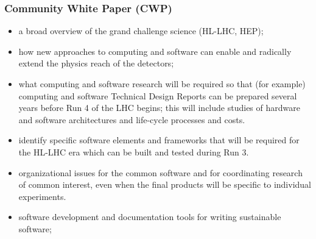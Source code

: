 \begin{frame}
\frametitle{Community White Paper (CWP)}

\begin{itemize}
  \item
    a broad overview of the grand challenge science (HL-LHC, HEP);
  \item
    how new approaches to computing and software can enable and
    radically extend the physics reach of the detectors;
  \item
    what computing and software research will be required so that
    (for example) computing and software Technical Design Reports
    can be prepared several years before Run 4 of the LHC begins;
    this will include studies of hardware and software architectures
    and life-cycle processes and costs.
   \item
    identify specific software elements and frameworks that will
    be required for the HL-LHC era which can be built and tested
    during Run 3.
   \item
     organizational issues for the common software and for
     coordinating research of common interest, even when the
     final products will be specific to individual experiments.
  \item
     software development and documentation tools for
     writing sustainable software;
\end{itemize}


\end{frame}


